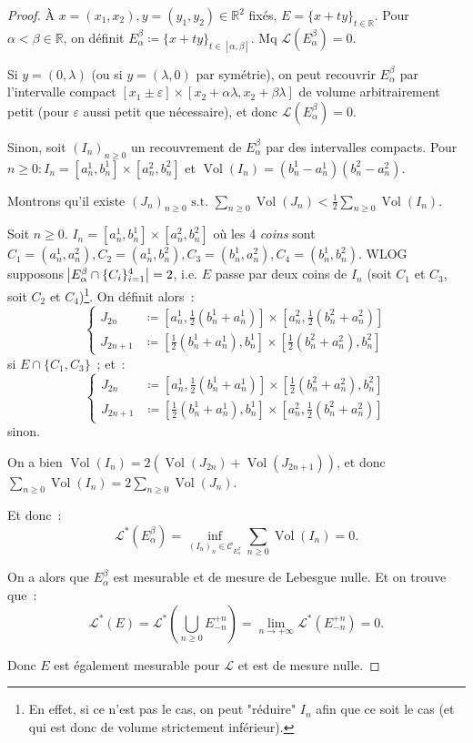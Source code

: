 \documentclass{article}
\theoremstyle{definition}
\newcommand{\pinfty}{{+\infty}}
\newcommand{\st}{\text{ s.t. }}
\newcommand{\R}{{\mathbb R}}
\DeclareMathOperator{\Vol}{Vol}
\begin{document}
\begin{proof} À $x = (x_1, x_2), y = (y_1, y_2) \in \R^2$ fixés, $E = \{x + ty\}_{t \in \R}$. Pour $\alpha < \beta \in \R$, on définit
$E_\alpha^\beta \coloneqq \{x+ty\}_{t \in [\alpha, \beta]}$. Mq $\mathcal L(E_\alpha^\beta) = 0$.

Si $y = (0, \lambda)$ (ou si $y = (\lambda, 0)$ par symétrie), on peut recouvrir $E_\alpha^\beta$ par l'intervalle compact
$[x_1 \pm \varepsilon] \times [x_2+\alpha\lambda, x_2+\beta\lambda]$ de volume arbitrairement petit (pour $\varepsilon$ aussi petit que nécessaire), et donc
$\mathcal L(E_\alpha^\beta) = 0$.

Sinon, soit $(I_n)_{n \geq 0}$ un recouvrement de $E_\alpha^\beta$ par des intervalles compacts. Pour $n \geq 0 : I_n = [a_n^1, b_n^1] \times [a_n^2, b_n^2]$ et
$\Vol(I_n) = (b_n^1-a_n^1)(b_n^2-a_n^2)$.

Montrons qu'il existe $(J_n)_{n \geq 0} \st \sum_{n \geq 0}\Vol(J_n) < \frac 12\sum_{n \geq 0}\Vol(I_n)$.

Soit $n \geq 0$. $I_n = [a_n^1, b_n^1] \times [a_n^2, b_n^2]$ où les 4 \textit{coins} sont $C_1 = (a_n^1, a_n^2), C_2 = (a_n^1, b_n^2), C_3 = (b_n^1, a_n^2), C_4 = (b_n^1, b_n^2)$.
WLOG supposons $\abs {E_\alpha^\beta \cap \{C_i\}_{i=1}^4} = 2$, i.e. $E$ passe par deux coins de $I_n$ (soit $C_1$ et $C_3$, soit $C_2$ et $C_4$)\footnote{En effet, si ce n'est pas
le cas, on peut "réduire" $I_n$ afin que ce soit le cas (et qui est donc de volume strictement inférieur).}. On définit alors~:
\[\begin{cases}
	J_{2n}   &\coloneqq [a_n^1, \frac 12(b_n^1 + a_n^1)] \times [a_n^2, \frac 12(b_n^2 + a_n^2)] \\
	J_{2n+1} &\coloneqq [\frac 12(b_n^1 + a_n^1), b_n^1] \times [\frac 12(b_n^2 + a_n^2), b_n^2]
\end{cases}\]
si $E \cap \{C_1, C_3\}$~; et~:
\[\begin{cases}
	J_{2n}   &\coloneqq [a_n^1, \frac 12(b_n^1 + a_n^1)] \times [\frac 12(b_n^2 + a_n^2), b_n^2] \\
	J_{2n+1} &\coloneqq [\frac 12(b_n^1 + a_n^1), b_n^1] \times [a_n^2, \frac 12(b_n^2 + a_n^2)]
\end{cases}\]
sinon.

On a bien $\Vol(I_n) = 2\left(\Vol(J_{2n}) + \Vol(J_{2n+1})\right)$, et donc $\sum_{n \geq 0}\Vol(I_n) = 2\sum_{n \geq 0}\Vol(J_n)$.

Et donc~:
\[\mathcal L^*(E_\alpha^\beta) = \inf_{(I_n)_n \in \mathcal C_{E_\alpha^\beta}}\sum_{n \geq 0}\Vol(I_n) = 0.\]

On a alors que $E_\alpha^\beta$ est mesurable et de mesure de Lebesgue nulle. Et on trouve que~:
\[\mathcal L^*(E) = \mathcal L^*(\bigcup_{n \geq 0}E_{-n}^{+n}) = \lim_{n \to \pinfty}\mathcal L^*(E_{-n}^{+n}) = 0.\]

Donc $E$ est également mesurable pour $\mathcal L$ et est de mesure nulle.
\end{proof}
\end{document}

